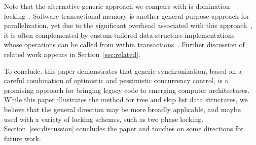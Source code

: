 Note that the alternative generic approach we compare with is domination locking~\cite{Gueta2011}.
Software transactional memory is another general-purpose approach for parallelization,
yet due to the significant overhead associated with this approach~\cite{Cascaval:2008,DuffyTM2010}, it is often complemented
by custom-tailored data structure implementations whose operations
can be called from within transactions~\cite{Herlihy:2008,Koskinen:2010,NathanBronson11}.
%
Further discussion of related work appears in Section~\ref{sec:related}.

To conclude, this paper demonstrates that generic synchronization, based on a careful combination of optimistic and
pessimistic concurrency control, is a promising approach for bringing legacy code to emerging computer architectures.
While this paper illustrates the method for tree and skip list data structures, we believe that the general direction may be more broadly applicable, and maybe used with a variety of locking schemes, such as two phase locking.
Section~\ref{sec:discussion} concludes the paper and touches on some directions for future work. 
